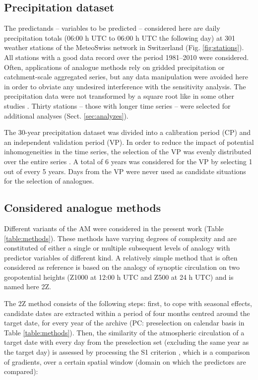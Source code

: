 \documentclass{ametsoc}
\begin{document}
\subsection{Precipitation dataset}
\label{sec:precip}

The predictands -- variables to be predicted -- considered here are daily precipitation totals (06:00 h UTC to 06:00 h UTC the following day) at 301 weather stations of the MeteoSwiss network in Switzerland (Fig. \ref{fig:stations}). All stations with a good data record over the period 1981--2010 were considered. Often, applications of analogue methods rely on gridded precipitation or catchment-scale aggregated series, but any data manipulation were avoided here in order to obviate any undesired interference with the sensitivity analysis. The precipitation data were not transformed by a square root like in some other studies \cite[see e.g.][]{Bontron2004}. Thirty stations -- those with longer time series -- were selected for additional analyses (Sect. \ref{sec:analyzes}).

The 30-year precipitation dataset was divided into a calibration period (CP) and an independent validation period (VP). In order to reduce the impact of potential inhomogeneities in the time series, the selection of the VP was evenly distributed over the entire series \citep[as in][]{BenDaoud2010}. A total of 6 years was considered for the VP by selecting 1 out of every 5 years. Days from the VP were never used as candidate situations for the selection of analogues.


\subsection{Considered analogue methods}
\label{sec:ams}

Different variants of the AM were considered in the present work (Table \ref{table:methods}). These methods have varying degrees of complexity and are constituted of either a single or multiple subsequent levels of analogy with predictor variables of different kind. A relatively simple method that is often considered as reference is based on the analogy of synoptic circulation on two geopotential heights (Z1000 at 12:00 h UTC and Z500 at 24 h UTC) and is named here 2Z.

The 2Z method consists of the following steps: first, to cope with seasonal effects, candidate dates are extracted within a period of four months centred around the target date, for every year of the archive (PC: preselection on calendar basis in Table \ref{table:methods}). Then, the similarity of the atmospheric circulation of a target date with every day from the preselection set (excluding the same year as the target day) is assessed by processing the S1 criterion \citep[Eq.\ \ref{eq:S1}, ][]{Teweles1954, Drosdowsky2003}, which is a comparison of gradients, over a certain spatial window (domain on which the predictors are compared):
\end{document}
